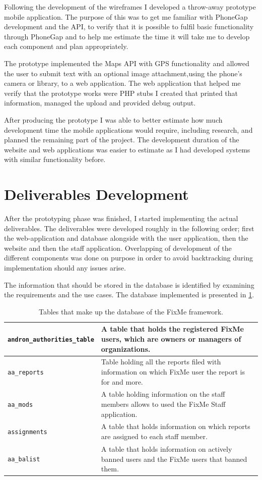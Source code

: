 \documentclass[12pt]{ecsproject}     %
\begin{document}
Following the development of the wireframes I developed a throw-away prototype mobile application. The purpose of this was to get me familiar with PhoneGap development and the API, to verify that it is possible to fulfil basic functionality through PhoneGap and to help me estimate the time it will take me to develop each component and plan appropriately.

The prototype implemented the Maps API with GPS functionality and allowed the user to submit text with an optional image attachment,using the phone's camera or library, to a web application. The web application that helped me verify that the prototype works were PHP stubs I created that printed that information, managed the upload and provided debug output. 

After producing the prototype I was able to better estimate how much development time the mobile applications would require, including research, and planned the remaining part of the project. The development duration of the website and web applications was easier to estimate as I had developed systems with similar functionality before. 

\section{Deliverables Development}
After the prototyping phase was finished, I started implementing the actual deliverables. The deliverables were developed roughly in the following order; first the web-application and database alongside with the user application, then the website and then the staff application. Overlapping of development of the different components was done on purpose in order to avoid backtracking during implementation should any issues arise.

The information that should be stored in the database is identified by examining the requirements and the use cases. The database implemented is presented in \ref{tab:dbschema}.

\begin{table}[ht]
\begin{tabular}[ht]{p{5cm} | p{8cm} }
\texttt{andron\_authorities\_table} & A table that holds the registered FixMe users, which are owners or managers of organizations. \\ 
\hline
\texttt{aa\_reports} & Table holding all the reports filed with information on which FixMe user the report is for and more.\\
\hline
\texttt{aa\_mods} & A table holding information on the staff members allows to used the FixMe Staff application. \\
\hline
\texttt{assignments} &  A table that holds information on which reports are assigned to each staff member. \\
\hline
\texttt{aa\_balist} & A table that holds information on actively banned users and the FixMe users that banned them. \\
\end{tabular}
\caption{Tables that make up the database of the FixMe framework.}
\label{tab:dbschema}
\end{table}
\end{document}

